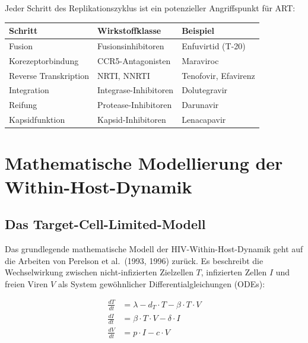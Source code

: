 ﻿\documentclass[a4paper,12pt]{article}
\theoremstyle{definition}
\begin{document}
Jeder Schritt des Replikationszyklus ist ein potenzieller Angriffspunkt f\"ur ART:

\begin{center}
\begin{tabular}{lll}
\toprule
\textbf{Schritt} & \textbf{Wirkstoffklasse} & \textbf{Beispiel} \\
\midrule
Fusion           & Fusionsinhibitoren       & Enfuvirtid (T-20) \\
Korezeptorbindung & CCR5-Antagonisten       & Maraviroc \\
Reverse Transkription & NRTI, NNRTI        & Tenofovir, Efavirenz \\
Integration      & Integrase-Inhibitoren    & Dolutegravir \\
Reifung          & Protease-Inhibitoren     & Darunavir \\
Kapsidfunktion   & Kapsid-Inhibitoren       & Lenacapavir \\
\bottomrule
\end{tabular}
\end{center}

\section{Mathematische Modellierung der Within-Host-Dynamik}

\subsection{Das Target-Cell-Limited-Modell}

Das grundlegende mathematische Modell der HIV-Within-Host-Dynamik geht auf die Arbeiten
von Perelson et al.~(1993, 1996) zur\"uck. Es beschreibt die Wechselwirkung zwischen
nicht-infizierten Zielzellen $T$, infizierten Zellen $I$ und freien Viren $V$ als System
gew\"ohnlicher Differentialgleichungen (ODEs):

\begin{align}
\frac{dT}{dt} &= \lambda - d_T \cdot T - \beta \cdot T \cdot V \label{eq:dT} \\
\frac{dI}{dt} &= \beta \cdot T \cdot V - \delta \cdot I \label{eq:dI} \\
\frac{dV}{dt} &= p \cdot I - c \cdot V \label{eq:dV}
\end{align}
\end{document}
